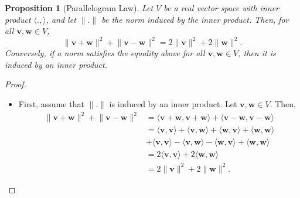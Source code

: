 \documentclass[a4paper, openany]{memoir}
\theoremstyle{definition}
\theoremstyle{plain}
\newtheorem{proposition}[definition]{Proposition}
\begin{document}
\begin{proposition}[Parallelogram Law]
    Let $V$ be a real vector space with inner product $\langle ., \rangle$, and let $\lVert . \rVert$ be the norm induced by the inner product. Then, for all $\bm{v}, \bm{w} \in V$,
    \[\lVert \bm{v} + \bm{w} \rVert^2 + \lVert \bm{v} - \bm{w} \rVert^2 = 2\lVert \bm{v} \rVert^2 + 2\lVert \bm{w} \rVert^2.\]
    Conversely, if a norm satisfies the equality above for all $\bm{v}, \bm{w} \in V$, then it is induced by an inner product.
\end{proposition}
\begin{proof}
    \hspace*{0pt}
    \begin{itemize}
        \item First, assume that $\lVert . \rVert$ is induced by an inner product. Let $\bm{v}, \bm{w} \in V$. Then,
        \begin{align*}
            \lVert \bm{v} + \bm{w} \rVert^2 + \lVert \bm{v} - \bm{w} \rVert^2 &= \langle \bm{v} + \bm{w}, \bm{v} + \bm{w} \rangle + \langle \bm{v} - \bm{w}, \bm{v} - \bm{w} \rangle \\
            &= \langle \bm{v}, \bm{v} \rangle + \langle \bm{v}, \bm{w} \rangle + \langle \bm{w}, \bm{v} \rangle + \langle \bm{w}, \bm{w} \rangle \\
            &+\langle \bm{v}, \bm{v} \rangle - \langle \bm{v}, \bm{w} \rangle - \langle \bm{w}, \bm{v} \rangle + \langle \bm{w}, \bm{w} \rangle \\
            &= 2\langle \bm{v}, \bm{v} \rangle + 2\langle \bm{w}, \bm{w} \rangle \\
            &= 2\lVert \bm{v} \rVert^2 + 2\lVert \bm{w} \rVert^2.
        \end{align*}


\end{itemize}
\end{proof}
\end{document}
